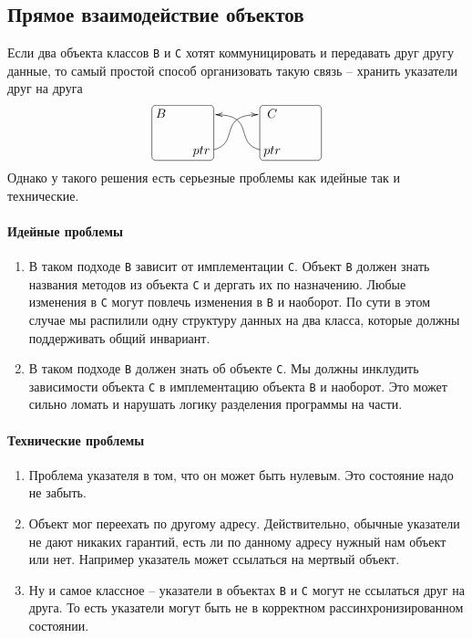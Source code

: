 \subsection{Прямое взаимодействие объектов}

Если два объекта классов \verb"B" и \verb"C" хотят коммуницировать и передавать друг другу данные, то самый простой способ организовать такую связь -- хранить указатели друг на друга
\[
\xymatrix@R=15pt@C=15pt{
	{B}
	{
	\save
   [].[rd]*[F-:<3pt>]\frm{}
   \restore
	}
	&{}&{}&{C}
	&{\phantom{C}}\\
	{}&{ptr}\ar@(r, l)[rru]+(-4,0)&{}&{ptr}
	{
	\save
   [].[ru]*[F-:<3pt>]\frm{}
   \restore
	}
	\ar@(l,r)[ull]+(4,0)&{}\\
}
\]
Однако у такого решения есть серьезные проблемы как идейные так и технические.

\paragraph{Идейные проблемы}
\begin{enumerate}
\item В таком подходе \verb"B" зависит от имплементации \verb"C".
Объект \verb"B" должен знать названия методов из объекта \verb"C" и дергать их по назначению.
Любые изменения в \verb"C" могут повлечь изменения в \verb"B" и наоборот.
По сути в этом случае мы распилили одну структуру данных на два класса, которые должны поддерживать общий инвариант.

\item В таком подходе \verb"B" должен знать об объекте \verb"C".
Мы должны инклудить зависимости объекта \verb"C" в имплементацию объекта \verb"B" и наоборот.
Это может сильно ломать и нарушать логику разделения программы на части.
\end{enumerate}

\paragraph{Технические проблемы}
\begin{enumerate}
\item Проблема указателя в том, что он может быть нулевым.
Это состояние надо не забыть.

\item Объект мог переехать по другому адресу.
Действительно, обычные указатели не дают никаких гарантий, есть ли по данному адресу нужный нам объект или нет.
Например указатель может ссылаться на мертвый объект.

\item Ну и самое классное -- указатели в объектах \verb"B" и \verb"C" могут не ссылаться друг на друга.
То есть указатели могут быть не в корректном рассинхронизированном состоянии.
\end{enumerate}

